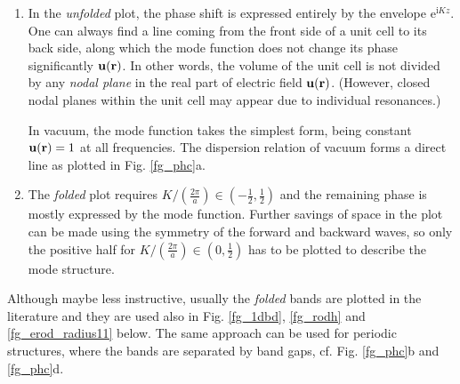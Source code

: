 \begin{enumerate}
 \item{In the \textit{unfolded} plot, the phase shift is expressed entirely by the envelope $\mathrm{e}^{\mathrm{i}Kz}$. One can always find a line coming from the front side of a unit cell to its back side, along which the mode function does not change its phase significantly $\mathbf{u({\mathbf{r}})}$. In other words, the volume of the unit cell is not divided by any \textit{nodal plane} in the real part of electric field  $\mathbf{u({\mathbf{r}})}$. (However, closed nodal planes within the unit cell may appear due to individual resonances.)

In vacuum, the mode function takes the simplest form, being constant $\mathbf{u({\mathbf{r}})} = 1$ at all frequencies. The dispersion relation of vacuum forms a direct line as plotted in Fig. \ref{fg_phc}a.} 
 \item{The \textit{folded} plot requires $K/\left(\frac{2\pi}{a}\right) \in (-\frac{1}{2}, \frac{1}{2})$ and the remaining phase is mostly expressed by the mode function. 
Further savings of space in the plot can be made using the symmetry of the forward and backward waves, so only the positive half for $K/\left(\frac{2\pi}{a}\right) \in (0, \frac{1}{2})$ has to be plotted to describe the mode structure.} 
 \end{enumerate}
Although maybe less instructive, usually the \textit{folded} bands are plotted in the literature and they are used also in Fig. \ref{fg_1dbd}, \ref{fg_rodh} and \ref{fg_erod_radius11} below. The same approach can be used for periodic structures, where the bands are separated by band gaps, cf. Fig. \ref{fg_phc}b and \ref{fg_phc}d.



